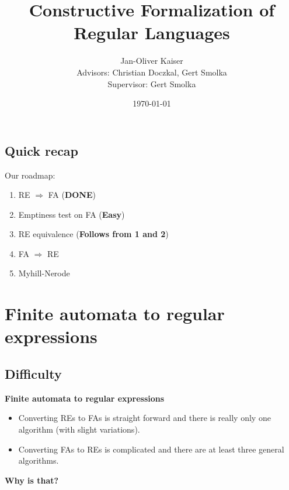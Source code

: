 \documentclass{beamer}
\begin{document}
\title{Constructive Formalization of Regular Languages}  
\author[Jan-Oliver Kaiser]{Jan-Oliver Kaiser \\{\small Advisors: Christian Doczkal, Gert Smolka }\\{\small Supervisor: Gert Smolka}}

\date{\today} 


\begin{frame}
    \titlepage
\end{frame}

\begin{frame}
    \tableofcontents
\end{frame}

\begin{frame}
    \section{Quick recap}

    Our roadmap:

    \begin{enumerate}
        \item RE $\Rightarrow$ FA (\textbf{DONE})
        \item Emptiness test on FA (\textbf{Easy})
        \item RE equivalence (\textbf{Follows from 1 and 2})
        \item FA $\Rightarrow$ RE
        \item Myhill-Nerode
    \end{enumerate}

\end{frame}

\section{Finite automata to regular expressions}
\subsection*{Difficulty}
\begin{frame}

    \large{\textbf{Finite automata to regular expressions}}

    \begin{itemize}
        \item
            Converting REs to FAs is straight forward and there is really only one algorithm (with slight variations).

            \pause

        \item
            Converting FAs to REs is complicated and there are at least three general algorithms.
    \end{itemize}

    \pause

    \textbf{Why is that?}

\end{frame}
\end{document}
